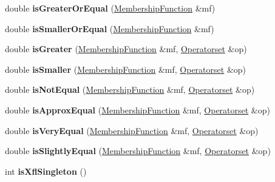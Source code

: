 \begin{DoxyCompactItemize}
\item 
\hypertarget{classParamMembershipFunction_acf58d8c17944ce335ea65e865de594bd}{
double {\bfseries isGreaterOrEqual} (\hyperlink{classMembershipFunction}{MembershipFunction} \&mf)}
\label{classParamMembershipFunction_acf58d8c17944ce335ea65e865de594bd}

\item 
\hypertarget{classParamMembershipFunction_a2fed0e1cf7bba7cfdcac3129c9e60585}{
double {\bfseries isSmallerOrEqual} (\hyperlink{classMembershipFunction}{MembershipFunction} \&mf)}
\label{classParamMembershipFunction_a2fed0e1cf7bba7cfdcac3129c9e60585}

\item 
\hypertarget{classParamMembershipFunction_aec16b2e4acf6fe86d68ce014a083d04b}{
double {\bfseries isGreater} (\hyperlink{classMembershipFunction}{MembershipFunction} \&mf, \hyperlink{classOperatorset}{Operatorset} \&op)}
\label{classParamMembershipFunction_aec16b2e4acf6fe86d68ce014a083d04b}

\item 
\hypertarget{classParamMembershipFunction_a77708decb44e42d2b787b09b2077904e}{
double {\bfseries isSmaller} (\hyperlink{classMembershipFunction}{MembershipFunction} \&mf, \hyperlink{classOperatorset}{Operatorset} \&op)}
\label{classParamMembershipFunction_a77708decb44e42d2b787b09b2077904e}

\item 
\hypertarget{classParamMembershipFunction_a69af7b21b42c827654aa01036df0029b}{
double {\bfseries isNotEqual} (\hyperlink{classMembershipFunction}{MembershipFunction} \&mf, \hyperlink{classOperatorset}{Operatorset} \&op)}
\label{classParamMembershipFunction_a69af7b21b42c827654aa01036df0029b}

\item 
\hypertarget{classParamMembershipFunction_a4dae58e7085e46d94c00973cde2cee3a}{
double {\bfseries isApproxEqual} (\hyperlink{classMembershipFunction}{MembershipFunction} \&mf, \hyperlink{classOperatorset}{Operatorset} \&op)}
\label{classParamMembershipFunction_a4dae58e7085e46d94c00973cde2cee3a}

\item 
\hypertarget{classParamMembershipFunction_ace6d8044ad5bedd574c9e70d244968ae}{
double {\bfseries isVeryEqual} (\hyperlink{classMembershipFunction}{MembershipFunction} \&mf, \hyperlink{classOperatorset}{Operatorset} \&op)}
\label{classParamMembershipFunction_ace6d8044ad5bedd574c9e70d244968ae}

\item 
\hypertarget{classParamMembershipFunction_aeb930aa4ed774a902ad2ea863af7a935}{
double {\bfseries isSlightlyEqual} (\hyperlink{classMembershipFunction}{MembershipFunction} \&mf, \hyperlink{classOperatorset}{Operatorset} \&op)}
\label{classParamMembershipFunction_aeb930aa4ed774a902ad2ea863af7a935}

\item 
\hypertarget{classParamMembershipFunction_a9653c292f5258feb8d8a8363d5096efa}{
int {\bfseries isXflSingleton} ()}
\label{classParamMembershipFunction_a9653c292f5258feb8d8a8363d5096efa}

\end{DoxyCompactItemize}
